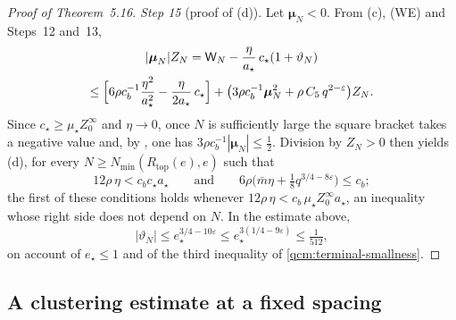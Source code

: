 \documentclass[11pt,letterpaper,reqno]{amsart}
\theoremstyle{definition}
\begin{document}
\begin{proof}[Proof of Theorem~5.16]
\emph{Step 15} (proof of (d)).
Let $\boldsymbol\mu_N<0$.
From (c), (WE) and Steps~12 and~13,
\begin{multline*}
|\boldsymbol\mu_N|Z_N=\mathsf W_N-\frac\eta{a_\star}\,c_\star(1+\vartheta_N)\\
\le\Bigl[6\rho c_b^{-1}\frac{\eta^2}{a_\star^2}-\frac\eta{2a_\star}\,c_\star\Bigr]+\bigl(3\rho c_b^{-1}\boldsymbol\mu_N^2+\rho\,C_5\,q^{2-\varepsilon}\bigr)Z_N .
\end{multline*}
Since $c_\star\ge\mu_\star Z_0^\infty$ and $\eta\to0$, once $N$ is sufficiently large the square bracket takes a negative value and, by \cite[Theorem~16.4, equation~(16.19)]{QEDConstruction}, one has $3\rho c_b^{-1}|\boldsymbol\mu_N|\le\frac12$.
Division by $Z_N>0$ then yields (d), for every $N\ge N_{\min}(R_{\mathrm{top}}(e),e)$ such that
\begin{equation*}
12\rho\,\eta<c_bc_\star a_\star\qquad\text{and}\qquad6\rho\bigl(\bar m\eta+\tfrac18q^{3/4-8\varepsilon}\bigr)\le c_b ;
\end{equation*}
the first of these conditions holds whenever $12\rho\,\eta<c_b\,\mu_\star Z_0^\infty a_\star$, an inequality whose right side does not depend on $N$.
In the estimate above,
\begin{equation*}
|\vartheta_N|\le e_\star^{3/4-10\varepsilon}\le e_\star^{3(1/4-9\varepsilon)}\le\tfrac1{512},
\end{equation*}
on account of $e_\star\le1$ and of the third inequality of \eqref{qcm:terminal-smallness}.
\end{proof}


\subsection{A clustering estimate at a fixed spacing}
\end{document}

